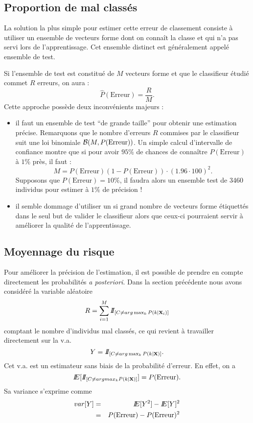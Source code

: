  

\subsection{Proportion de mal class\'es}
La solution la plus simple pour estimer cette erreur de classement consiste
\`a utiliser un ensemble de vecteurs forme dont on conna\^it la classe
et qui n'a pas servi lors de l'apprentissage. Cet ensemble distinct est 
g\'en\'eralement appel\'e ensemble de test.

Si l'ensemble de test est constitu\'e de $M$ vecteurs forme et que le 
classifieur \'etudi\'e commet $R$ erreurs, on aura :
$$
\hat{P}(\mbox{Erreur})=\frac{R}{M}.
$$
Cette approche poss\`ede deux inconv\'enients majeurs :
\begin{itemize}
\item il faut un ensemble de test ``de grande taille'' pour obtenir une estimation pr\'ecise. 
Remarquons que le nombre d'erreurs $R$ commises par le classifieur suit une loi binomiale 
${\cal B}(M,P(\mbox{Erreur}))$. Un simple calcul d'intervalle de confiance montre
que si pour avoir $95\%$ de chances de conna\^itre $P(\mbox{Erreur})$ \`a $1\%$ pr\`es, il faut :
$$
M= P(\mbox{Erreur})(1-P(\mbox{Erreur}))\cdot(1.96 \cdot 100)^2.
$$
Supposons que $P(\mbox{Erreur})=10\%$, il faudra alors un ensemble test de 3460 individus pour
estimer \`a $1\%$ de pr\'ecision !
\item il semble dommage d'utiliser un si grand nombre de vecteurs forme \'etiquett\'es dans le
seul but de valider le classifieur alors que ceux-ci pourraient servir \`a am\'eliorer
la qualit\'e de l'apprentissage.
\end{itemize}

\subsection{Moyennage du risque}

Pour am\'eliorer la pr\'ecision de l'estimation, il est possible de prendre en
compte directement les probabilit\'es {\em a posteriori}. Dans la section pr\'ec\'edente
nous avons consid\'er\'e la variable al\'eatoire 
$$
R=\sum_{i=1}^M I\!\!I_{[C \neq arg \max_{k} P(k | \mbox{\bf x}_i)]}
$$
comptant le nombre d'individus mal class\'es, ce qui revient \`a travailler directement
sur la v.a.
$$
Y=I\!\!I_{[C \neq arg \max_{k} P(k | \mbox{\bf x})]}.
$$ 
Cet v.a. est un estimateur sans biais de la probabilit\'e d'erreur. En effet, on a
$$
I\!\!E[I\!\!I_{[C\neq arg max_{k} P(k | \mbox{\bf x})]}]=P(\mbox{Erreur}).
$$ 
Sa variance s'exprime comme 
\begin{eqnarray*}
var[Y] & = & I\!\!E[Y^2]-I\!\!E[Y]^2 \\
       & = &  P(\mbox{Erreur})-P(\mbox{Erreur})^2
\end{eqnarray*}

